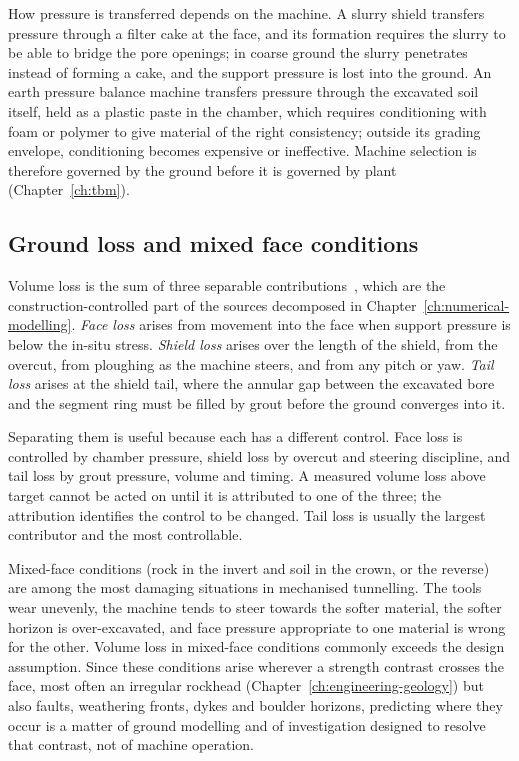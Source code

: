 How pressure is transferred depends on the machine. A slurry shield transfers
pressure through a filter cake at the face, and its formation requires the
slurry to be able to bridge the pore openings; in coarse ground the slurry
penetrates instead of forming a cake, and the support pressure is lost into
the ground. An earth pressure balance machine transfers pressure through the
excavated soil itself, held as a plastic paste in the chamber, which requires
conditioning with foam or polymer to give material of the right consistency;
outside its grading envelope, conditioning becomes expensive or ineffective.
Machine selection is therefore governed by the ground before it is governed by plant
(Chapter~\ref{ch:tbm}).

\subsection{Ground loss and mixed face conditions}
\label{sec:ground-loss}

Volume loss is the sum of three separable
contributions~\citep{mair1996settlement}, which are the
construction-controlled part of the sources decomposed in
Chapter~\ref{ch:numerical-modelling}. \emph{Face loss} arises from movement into the face when
support pressure is below the in-situ stress. \emph{Shield loss} arises over
the length of the shield, from the overcut, from ploughing as the machine
steers, and from any pitch or yaw. \emph{Tail loss} arises at the shield tail,
where the annular gap between the excavated bore and the segment ring must be
filled by grout before the ground converges into it.

Separating them is useful because each has a different control.
Face loss is controlled by chamber pressure, shield loss by overcut and
steering discipline, and tail loss by grout pressure, volume and timing. A
measured volume loss above target cannot be acted on until it is attributed
to one of the three; the attribution identifies the control to be changed. Tail loss is usually the
largest contributor and the most controllable.

Mixed-face conditions (rock in the invert and soil in the crown, or the
reverse) are among the most damaging situations in mechanised tunnelling.
The tools wear unevenly, the machine tends to steer towards the softer
material, the softer horizon is over-excavated, and face pressure appropriate
to one material is wrong for the other. Volume loss in mixed-face conditions
commonly exceeds the design assumption. Since these conditions arise wherever
a strength contrast crosses the face, most often an irregular rockhead
(Chapter~\ref{ch:engineering-geology}) but also faults, weathering fronts,
dykes and boulder horizons, predicting where they occur is a matter of
ground modelling and of investigation designed to resolve that contrast, not
of machine operation.

